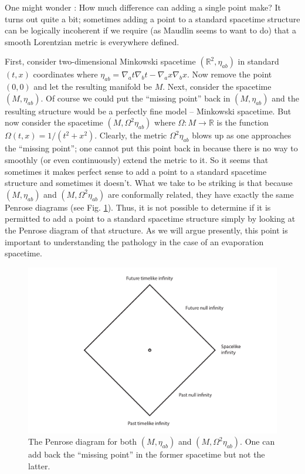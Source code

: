 \documentclass[authoryear,12pt,3p]{jowarticle}
\begin{document}
One might wonder \citep[cf.][p. 20]{Maudlin}: How much difference can adding  a single point make? It turns out quite a bit; sometimes adding a point to a standard spacetime structure can be logically incoherent if we require (as Maudlin seems to want to do) that a smooth Lorentzian metric is everywhere defined.

First, consider two-dimensional Minkowski spacetime $(\mathbb{R}^2, \eta_{ab})$ in standard $(t,x)$ coordinates where $\eta_{ab}=\nabla_at\nabla_bt-\nabla_ax\nabla_bx$. Now remove the point $(0,0)$ and let the resulting manifold be $M$. Next, consider the spacetime $(M,\eta_{ab})$. Of course we could put the ``missing point'' back in $(M,\eta_{ab})$ and the resulting structure would be a perfectly fine model -- Minkowski spacetime. But now consider the spacetime $(M,\Omega^2\eta_{ab})$ where $\Omega: M \rightarrow \mathbb{R}$ is the function $\Omega(t,x)=1/(t^2+x^2)$. Clearly, the metric $\Omega^2\eta_{ab}$ blows up as one approaches the ``missing point''; one cannot put this point back in because there is no way to smoothly (or even continuously) extend the metric to it. So it seems that sometimes it makes perfect sense to add a point to a standard spacetime structure and sometimes it doesn't. What we take to be striking is that because $(M,\eta_{ab})$ and $(M,\Omega^2\eta_{ab})$ are conformally related, they have exactly the same Penrose diagrams (see Fig. \ref{ConMink}). Thus, it is not possible to determine if it is permitted to add a point to a standard spacetime structure simply by looking at the Penrose diagram of that structure. As we will argue presently, this point is important to understanding the pathology in the case of an evaporation spacetime.

\begin{figure}[h]    \centering
   \includegraphics[width=6in]{ManchakBH1.pdf}
   \caption{\label{ConMink} The Penrose diagram for both $(M,\eta_{ab})$ and $(M,\Omega^2\eta_{ab})$. One can add back the ``missing point'' in the former spacetime but not the latter.}
\end{figure}
\end{document}
